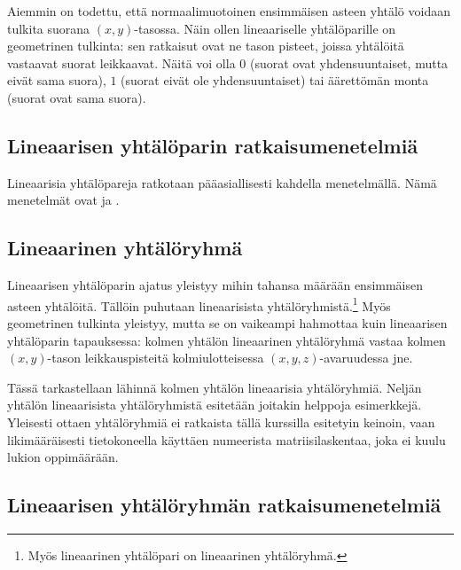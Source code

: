 Aiemmin on todettu, että normaalimuotoinen ensimmäisen asteen yhtälö voidaan tulkita suorana
$(x, y)$-tasossa. Näin ollen lineaariselle yhtälöparille on geometrinen tulkinta: sen
ratkaisut ovat ne tason pisteet, joissa yhtälöitä vastaavat
suorat leikkaavat. Näitä voi olla
$0$ (suorat ovat yhdensuuntaiset, mutta eivät sama suora),
$1$ (suorat eivät ole yhdensuuntaiset) tai
äärettömän monta (suorat ovat sama suora).


\subsection*{Lineaarisen yhtälöparin ratkaisumenetelmiä}

Lineaarisia yhtälöpareja ratkotaan pääasiallisesti kahdella menetelmällä.
Nämä menetelmät ovat  ja
.


\subsection*{Lineaarinen yhtälöryhmä}

Lineaarisen yhtälöparin ajatus yleistyy mihin tahansa määrään ensimmäisen asteen yhtälöitä.
Tällöin puhutaan lineaarisista yhtälöryhmistä.\footnote{Myös lineaarinen yhtälöpari on lineaarinen yhtälöryhmä.}
Myös geometrinen tulkinta yleistyy, mutta se on vaikeampi hahmottaa kuin lineaarisen yhtälöparin tapauksessa:
kolmen yhtälön lineaarinen yhtälöryhmä vastaa kolmen $(x, y)$-tason leikkauspisteitä
kolmiulotteisessa $(x, y, z)$-avaruudessa jne.

Tässä tarkastellaan lähinnä kolmen yhtälön lineaarisia yhtälöryhmiä. Neljän yhtälön
lineaarisista yhtälöryhmistä esitetään joitakin helppoja esimerkkejä. Yleisesti ottaen yhtälöryhmiä
ei ratkaista tällä kurssilla esitetyin keinoin, vaan likimääräisesti tietokoneella käyttäen numeerista 
matriisilaskentaa, joka ei kuulu lukion oppimäärään.

\subsection*{Lineaarisen yhtälöryhmän ratkaisumenetelmiä}



